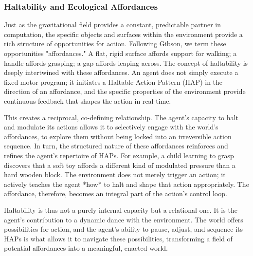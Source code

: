 \subsubsection*{Haltability and Ecological Affordances}
Just as the gravitational field provides a constant, predictable partner in computation, the specific objects and surfaces within the environment provide a rich structure of opportunities for action. Following Gibson, we term these opportunities "affordances." A flat, rigid surface affords support for walking; a handle affords grasping; a gap affords leaping across. The concept of haltability is deeply intertwined with these affordances. An agent does not simply execute a fixed motor program; it initiates a Haltable Action Pattern (HAP) in the direction of an affordance, and the specific properties of the environment provide continuous feedback that shapes the action in real-time.

This creates a reciprocal, co-defining relationship. The agent’s capacity to halt and modulate its actions allows it to selectively engage with the world’s affordances, to explore them without being locked into an irreversible action sequence. In turn, the structured nature of these affordances reinforces and refines the agent’s repertoire of HAPs. For example, a child learning to grasp discovers that a soft toy affords a different kind of modulated pressure than a hard wooden block. The environment does not merely trigger an action; it actively teaches the agent *how* to halt and shape that action appropriately. The affordance, therefore, becomes an integral part of the action's control loop.

Haltability is thus not a purely internal capacity but a relational one. It is the agent's contribution to a dynamic dance with the environment. The world offers possibilities for action, and the agent's ability to pause, adjust, and sequence its HAPs is what allows it to navigate these possibilities, transforming a field of potential affordances into a meaningful, enacted world.

